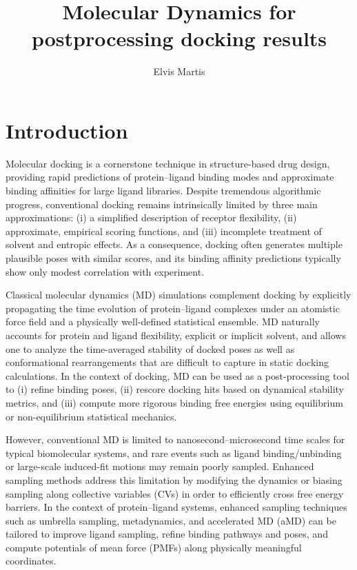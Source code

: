 \documentclass[12pt,a4paper]{article}
\title{Molecular Dynamics for postprocessing docking results}
\author{Elvis Martis}
\date{}
\begin{document}
\maketitle

\section{Introduction}

Molecular docking is a cornerstone technique in structure-based drug design, providing rapid predictions of protein--ligand binding modes and approximate binding affinities for large ligand libraries.\cite{Meng1992,Kitchen2004,Pagadala2017} Despite tremendous algorithmic progress, conventional docking remains intrinsically limited by three main approximations: (i) a simplified description of receptor flexibility, (ii) approximate, empirical scoring functions, and (iii) incomplete treatment of solvent and entropic effects.\cite{Warren2006,Chen2014} As a consequence, docking often generates multiple plausible poses with similar scores, and its binding affinity predictions typically show only modest correlation with experiment.

Classical molecular dynamics (MD) simulations complement docking by explicitly propagating the time evolution of protein--ligand complexes under an atomistic force field and a physically well-defined statistical ensemble.\cite{McCammon1977,FrenkelSmit2002,Hollingsworth2018} MD naturally accounts for protein and ligand flexibility, explicit or implicit solvent, and allows one to analyze the time-averaged stability of docked poses as well as conformational rearrangements that are difficult to capture in static docking calculations. In the context of docking, MD can be used as a post-processing tool to (i) refine binding poses, (ii) rescore docking hits based on dynamical stability metrics, and (iii) compute more rigorous binding free energies using equilibrium or non-equilibrium statistical mechanics.

However, conventional MD is limited to nanosecond--microsecond time scales for typical biomolecular systems, and rare events such as ligand binding/unbinding or large-scale induced-fit motions may remain poorly sampled. Enhanced sampling methods address this limitation by modifying the dynamics or biasing sampling along collective variables (CVs) in order to efficiently cross free energy barriers.\cite{Tiwary2013,Mlynsky2020} In the context of protein--ligand systems, enhanced sampling techniques such as umbrella sampling, metadynamics, and accelerated MD (aMD) can be tailored to improve ligand sampling, refine binding pathways and poses, and compute potentials of mean force (PMFs) along physically meaningful coordinates.
\end{document}
